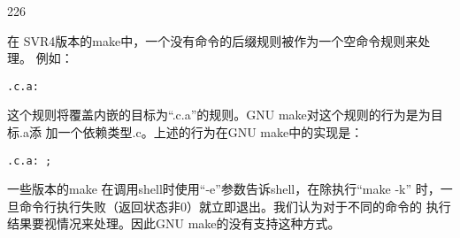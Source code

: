 \begin{dinglist}{226}
\item 在 SVR4版本的make中，一个没有命令的后缀规则被作为一个空命令规则来处理。
    例如：

\begin{Verbatim}[]
.c.a:
\end{Verbatim}

这个规则将覆盖内嵌的目标为“.c.a”的规则。GNU make对这个规则的行为是为目标.a添
加一个依赖类型.c。上述的行为在GNU make中的实现是：

\begin{Verbatim}[]
.c.a: ;
\end{Verbatim}

\item  一些版本的make 在调用shell时使用“-e”参数告诉shell，在除执行“make -k”
    时，一旦命令行执行失败（返回状态非0）就立即退出。我们认为对于不同的命令的
    执行结果要视情况来处理。因此GNU make的没有支持这种方式。

\end{dinglist}
